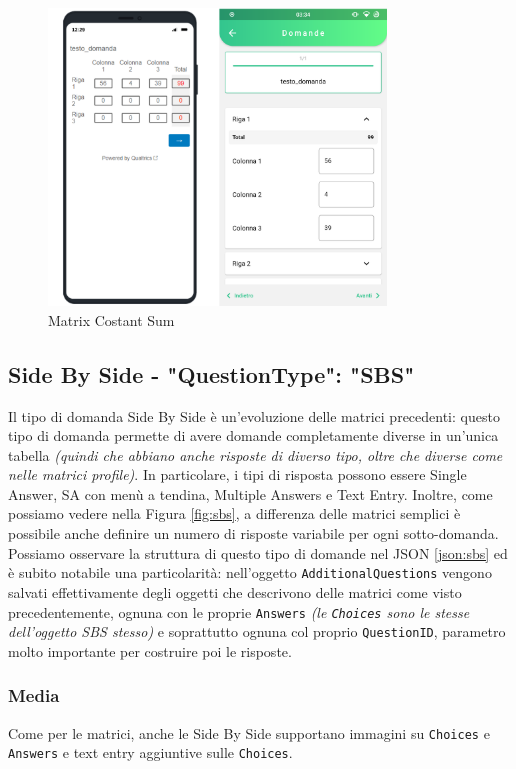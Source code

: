 \begin{figure}[h!]
\centering
\includegraphics[width=0.8\textwidth]{img/matrix_cs}
\caption{Matrix Costant Sum}
\label{fig:matrix_cs}
\end{figure}

\clearpage
\subsection{Side By Side - "QuestionType": "SBS"}
Il tipo di domanda Side By Side è un'evoluzione delle matrici precedenti: questo tipo di domanda permette di avere domande completamente diverse in un'unica tabella \textit{(quindi che abbiano anche risposte di diverso tipo, oltre che diverse come nelle matrici profile)}. In particolare, i tipi di risposta possono essere Single Answer, SA con menù a tendina, Multiple Answers e Text Entry. Inoltre, come possiamo vedere nella Figura \ref{fig:sbs}, a differenza delle matrici semplici è possibile anche definire un numero di risposte variabile per ogni sotto-domanda. Possiamo osservare la struttura di questo tipo di domande nel JSON \ref{json:sbs} ed è subito notabile una particolarità: nell'oggetto \texttt{AdditionalQuestions} vengono salvati effettivamente degli oggetti che descrivono delle matrici come visto precedentemente, ognuna con le proprie \texttt{Answers} \textit{(le \texttt{Choices} sono le stesse dell'oggetto SBS stesso)} e soprattutto ognuna col proprio \texttt{QuestionID}, parametro molto importante per costruire poi le risposte.

\subsubsection{Media}
Come per le matrici, anche le Side By Side supportano immagini su \texttt{Choices} e \texttt{Answers} e text entry aggiuntive sulle \texttt{Choices}.

